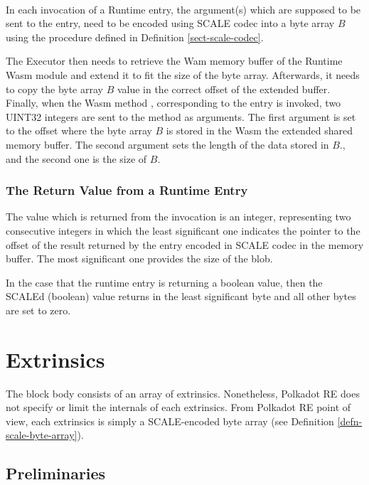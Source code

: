 \documentclass{book}
\newcommand{\tmverbatim}[1]{{\ttfamily{#1}}}
\begin{document}
\

In each invocation of a Runtime entry, the argument(s) which are supposed to
be sent to the entry, need to be encoded using SCALE codec into a byte array
$B$ using the procedure defined in Definition \ref{sect-scale-codec}.

The Executor then needs to retrieve the Wam memory buffer of the Runtime Wasm
module and extend it to fit the size of the byte array. Afterwards, it needs
to copy the byte array $B$ value in the correct offset of the extended buffer.
Finally, when the Wasm method \tmverbatim{runtime\_entry}, corresponding to
the entry is invoked, two UINT32 integers are sent to the method as arguments.
The first argument \tmverbatim{data} is set to the offset where the byte array
$B$ is stored in the Wasm the extended shared memory buffer. The second
argument \tmverbatim{len} sets the length of the data stored in $B$., and the
second one is the size of $B$.

\subsubsection{The Return Value from a Runtime
Entry}\label{sect-runtime-return-value}

The value which is returned from the invocation is an \tmverbatim{i64}
integer, representing two consecutive \tmverbatim{i32} integers in which the
least significant one indicates the pointer to the offset of the result
returned by the entry encoded in SCALE codec in the memory buffer. The most
significant one provides the size of the blob.

In the case that the runtime entry is returning a boolean value, then the
SCALEd (boolean) value returns in the least significant byte and all other
bytes are set to zero.

\section{Extrinsics}\label{sect-extrinsics}

The block body consists of an array of extrinsics. Nonetheless, Polkadot RE
does not specify or limit the internals of each extrinsics. From Polkadot RE
point of view, each extrinsics is simply a SCALE-encoded byte array (see
Definition \ref{defn-scale-byte-array}).

\subsection{Preliminaries}
\end{document}
